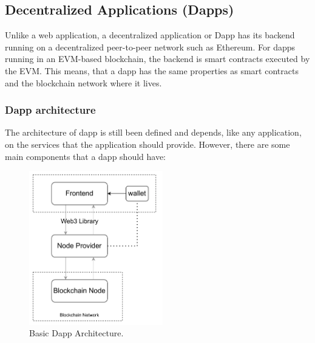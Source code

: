 \documentclass[11pt,a4paper]{report}
\begin{document}
\subsection{Decentralized Applications (Dapps)}\label{sec:dapps}
Unlike a web application, a decentralized application or Dapp\cite{book:dapps}\cite{dapps}\cite{dapps_arch} has its backend running on a decentralized peer-to-peer network such as Ethereum. For dapps running in an EVM-based blockchain, the backend is smart contracts executed by the EVM. This means, that a dapp has the same properties as smart contracts and the blockchain network where it lives.
\subsubsection{Dapp architecture}\label{dapp}
The architecture of dapp is still been defined and depends, like any application, on the services that the application should provide. However, there are some main components that a dapp should have: 
\begin{figure}[htp]
	\centering
	\includegraphics[width=0.52\textwidth]{./images/dappcomponents1}
	\caption{Basic Dapp Architecture.}
	\label{fig:dappcomponents}
\end{figure}
\end{document}
